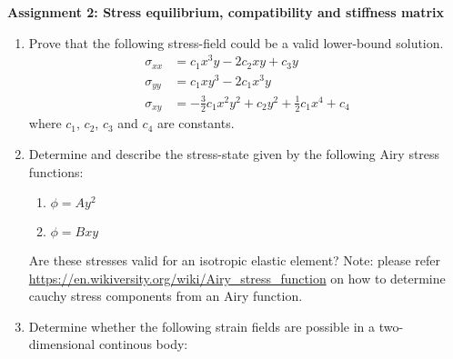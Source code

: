 \documentclass[a4paper,12pt]{article}
\begin{document}
\begin{centering}
	\textbf{
		Assignment 2: Stress equilibrium, compatibility and stiffness matrix\\
	}
\end{centering}

\vspace{1em}
 
\begin{enumerate}
	\item Prove that the following stress-field could be a valid lower-bound solution.
	\begin{align*}
		\sigma_{xx} & = c_1 x^3 y - 2c_2 xy + c_3 y\\
		\sigma_{yy} & = c_1 x y^3 - 2c_1 x^3 y\\
		\sigma_{xy} & = -\frac{3}{2}c_1x^2y^2 + c_2 y^2 + \frac{1}{2}c_1 x^4 + c_4
	\end{align*}
	where $c_1$, $c_2$, $c_3$ and $c_4$ are constants.

	\item Determine and describe the stress-state given by the following Airy stress functions:
	\begin{enumerate}
		\item $\phi = Ay^2$ 
		\item $\phi = Bxy$
	\end{enumerate}
	Are these stresses valid for an isotropic elastic element? Note: please refer \url{https://en.wikiversity.org/wiki/Airy_stress_function} on how to determine cauchy stress components from an Airy function.

	\item Determine whether the following strain fields are possible in a two-dimensional continous body:
	

\end{enumerate}
\end{document}
